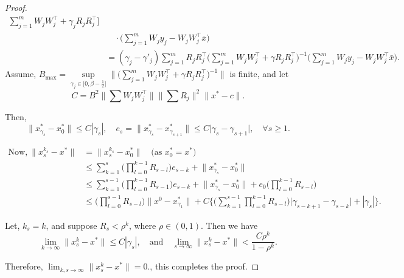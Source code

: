 \documentclass[smallextended,referee,envcountsect]{svjour3}
\begin{document}
\begin{proof}
\begin{align*}
{ \sum_{j=1}^m W_j W_j^\top + \gamma_j R_j R_j^\top } \Big] \\
&\quad \cdot \Big( \sum_{j=1}^{m} W_j y_j - W_j W_j^\top \bar{x} \Big) \\
&= (\gamma_j - \gamma'_j) \sum_{j=1}^{m} R_j R_j^\top 
\Big( \sum_{j=1}^{m} W_j W_j^\top + \gamma R_j R_j^\top \Big)^{-1} 
\Big( \sum_{j=1}^{m} W_j y_j - W_j W_j^\top \bar{x} \Big).
\end{align*}
Assume, $ B_{\max} = \sup\limits_{\gamma_j \in \Big[0, \beta - \tfrac{1}{2} \Big]} 
\Big\| \Big( \sum_{j=1}^{m} W_j W_j^\top + \gamma R_j R_j^\top \Big)^{-1} \Big\| $ is finite, and let 
\[
C = B^2 \Big\| \sum W_j W_j^\top \Big\| \Big\| \sum R_j \Big\|^2 \Big\| x^* - c \Big\|.
\]

Then,
\[
\Big\| x^*_{\gamma_s} - x_0^* \Big\| \leq C |\gamma_s|, \quad 
e_s = \Big\| x^*_{\gamma_s} - x^*_{\gamma_{s+1}} \Big\| \leq C \Big| \gamma_s - \gamma_{s+1} \Big|, \quad \forall s \geq 1.
\]


\begin{align*}
\text{Now,}~\Big\| x_s^{k_s} - x^* \Big\| 
&= \Big\| x_s^{k_s} - x^*_0 \Big\| \quad \text{(as } x_0^* = x^* \text{)} \\
&\leq \sum_{k=1}^{s} \Big( \prod_{l=0}^{k-1} R_{s-l} \Big) e_{s-k} + \Big\| x^*_{\gamma_s} - x_0^* \Big\| \\
&\leq \sum_{k=1}^{s-1} \Big( \prod_{l=0}^{k-1} R_{s-1} \Big) e_{s-k} + \Big\| x^*_{\gamma_s} - x_0^* \Big\| + e_0 \Big( \prod_{l=0}^{k-1} R_{s-l} \Big) \\
&\leq \Big( \prod_{l=0}^{s-1} R_{s-l} \Big) \Big\| x^{0} - x_{\gamma_1}^* \Big\| + 
C \Big\{ \Big( \sum_{k=1}^{s-1} \prod_{l=0}^{k-1} R_{s-l} \Big) \Big| \gamma_{s-k+1} - \gamma_{s-k} \Big| + |\gamma_s| \Big\}.
\end{align*}

Let, $ k_s = k $, and suppose $ R_s < \rho^k $, where $ \rho \in (0,1) $. Then we have
\[
\lim_{k \to \infty} \Big\| x_s^{k} - x^* \Big\| \leq C |\gamma_s|, \quad 
\text{and} \quad 
\lim_{s \to \infty} \Big\| x_s^{k} - x^* \Big\| < \frac{C \rho^k}{1 - \rho^k}.
\]

Therefore, 
\(
\lim_{k,s \to \infty} \Big\| x_s^{k} - x^* \Big\| = 0.
\), this completes the proof.
\end{proof}
\end{document}
